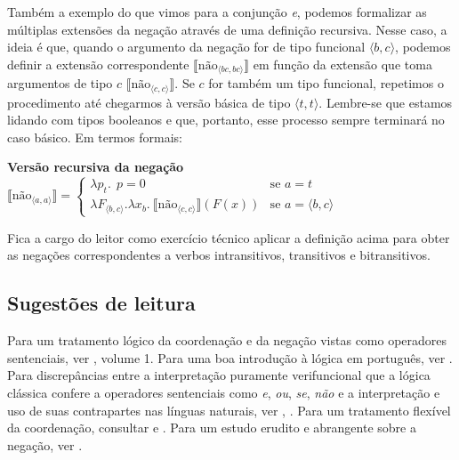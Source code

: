 Também a exemplo do que vimos para a conjunção \textit{e}, podemos formalizar as múltiplas extensões da negação através de uma definição recursiva. Nesse caso, a ideia é que, quando o argumento da negação for de tipo funcional $\langle b,c\rangle$, podemos definir a extensão correspondente $\llbracket \text{não}_{\langle bc,bc\rangle} \rrbracket$ em função da extensão que toma argumentos de tipo $c$ $\llbracket \text{não}_{\langle c,c\rangle} \rrbracket$. Se $c$ for também um tipo funcional, repetimos o procedimento até chegarmos à versão básica de tipo $\langle t,t\rangle$. Lembre-se que estamos lidando com tipos booleanos e que, portanto, esse processo sempre terminará no caso básico. Em termos formais:\\

\begin{tcolorbox}[boxrule=0pt,sharp corners]
	
	\textbf{Versão recursiva da negação}\\
	
	$\llbracket \text{não}_{\langle a,a\rangle}\rrbracket =
	\begin{cases}
	\lambda p_{t}.\ \ p=0 & \text{se } a =
	t\\
	\lambda F_{\langle b,c\rangle}.\lambda x_{b}.\ \llbracket
	\text{não}_{\langle c,c\rangle}\rrbracket (F(x)) &
	\text{se } a = \langle b,c\rangle
	\end{cases}$	
	
\end{tcolorbox}

\n Fica a cargo do leitor como exercício técnico aplicar a definição acima para obter as negações correspondentes a verbos intransitivos, transitivos e bitransitivos.

\bigskip

\begin{tcolorbox}[parbox=false,boxrule=0pt,sharp corners,breakable]

\section*{Sugestões de leitura}

\n Para um tratamento lógico da coordenação e da negação vistas como operadores sentenciais, ver \cite{gamut91}, volume 1. Para uma boa introdução à lógica em português, ver \cite{mortari16}. Para discrepâncias entre a interpretação puramente verifuncional que a lógica clássica confere a operadores sentenciais como \textit{e}, \textit{ou}, \textit{se}, \textit{não} e a interpretação e uso de suas contrapartes nas línguas naturais, ver \cite{grice89}, \cite{gamut91}. Para um tratamento flexível da coordenação, consultar \cite{gazdar80} e \cite{parroo83}. Para um estudo erudito e abrangente sobre a negação, ver \cite{horn89}.

\end{tcolorbox}

